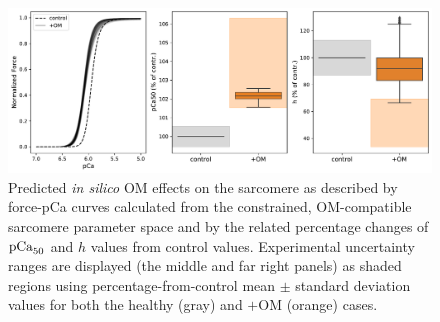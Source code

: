 \begin{figure}[!ht]
    \myfloatalign
    \includegraphics[width=\textwidth]{figures/chapter05/Fig2.pdf}
    \caption{Predicted \textit{in silico} OM effects on the sarcomere as described by force-pCa curves calculated from the constrained, OM-compatible sarcomere parameter space and by the related percentage changes of $\textrm{pCa}_{50}$ and $h$ values from control values. Experimental uncertainty ranges are displayed (the middle and far right panels) as shaded regions using percentage-from-control mean $\pm$ standard deviation values for both the healthy (gray) and $+$OM (orange) cases.}
    \label{fig:wave0mappingtofpCa}
\end{figure}


%
%
%
